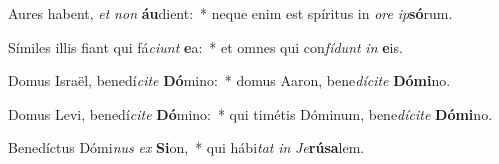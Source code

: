 \item Aures habent, \textit{et} \textit{non} \textbf{áu}dient:~* neque enim est spíritus in \textit{o}\textit{re} \textit{ip}\textbf{só}rum.
\item Símiles illis fiant qui fá\textit{ci}\textit{unt} \textbf{e}a:~* et omnes qui con\textit{fí}\textit{dunt} \textit{in} \textbf{e}is.
\item Domus Israël, benedí\textit{ci}\textit{te} \textbf{Dó}mino:~* domus Aaron, bene\textit{dí}\textit{ci}\textit{te} \textbf{Dó}\textbf{mi}no.
\item Domus Levi, benedí\textit{ci}\textit{te} \textbf{Dó}mino:~* qui timétis Dóminum, bene\textit{dí}\textit{ci}\textit{te} \textbf{Dó}\textbf{mi}no.
\item Benedíctus Dómi\textit{nus} \textit{ex} \textbf{Si}on,~* qui hábi\textit{tat} \textit{in} \textit{Je}\textbf{rú}\textbf{sa}lem.
